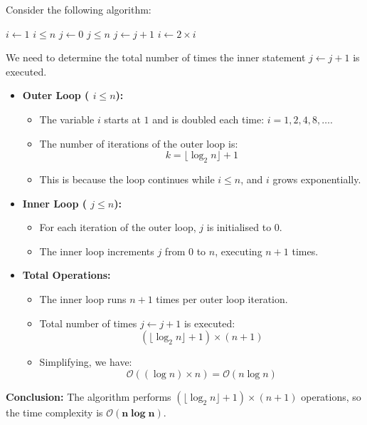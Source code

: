 \begin{example}

    Consider the following algorithm:
    
    \begin{codebox}
        \li $i \gets 1$
        \li \While $i \leq n$ \Do
        \li     $j \gets 0$
        \li     \While $j \leq n$ \Do
        \li         $j \gets j + 1$
                \End
        \li     $i \gets 2 \times i$
            \End
    \end{codebox}
    
    We need to determine the total number of times the inner statement $j \gets j + 1$ is executed.
    
    \begin{itemize}
        \item \textbf{Outer Loop (\texttt{\While} $i \leq n$):}
        \begin{itemize}
            \item The variable $i$ starts at $1$ and is doubled each time: $i = 1, 2, 4, 8, \ldots$.
            \item The number of iterations of the outer loop is:
            \[ k = \lfloor \log_2 n \rfloor + 1 \]
            \item This is because the loop continues while $i \leq n$, and $i$ grows exponentially.
        \end{itemize}
        \item \textbf{Inner Loop (\texttt{\While} $j \leq n$):}
        \begin{itemize}
            \item For each iteration of the outer loop, $j$ is initialised to $0$.
            \item The inner loop increments $j$ from $0$ to $n$, executing $n + 1$ times.
        \end{itemize}
        \item \textbf{Total Operations:}
        \begin{itemize}
            \item The inner loop runs $n + 1$ times per outer loop iteration.
            \item Total number of times $j \gets j + 1$ is executed:
            \[ (\lfloor \log_2 n \rfloor + 1) \times (n + 1) \]
            \item Simplifying, we have:
            \[ \mathcal{O}((\log n) \times n) = \mathcal{O}(n \log n) \]
        \end{itemize}
    \end{itemize}
    
    \textbf{Conclusion:} The algorithm performs $(\lfloor \log_2 n \rfloor + 1) \times (n + 1)$ operations, so the time complexity is $\boldsymbol{\mathcal{O}(n \log n)}$.
    
\end{example}

